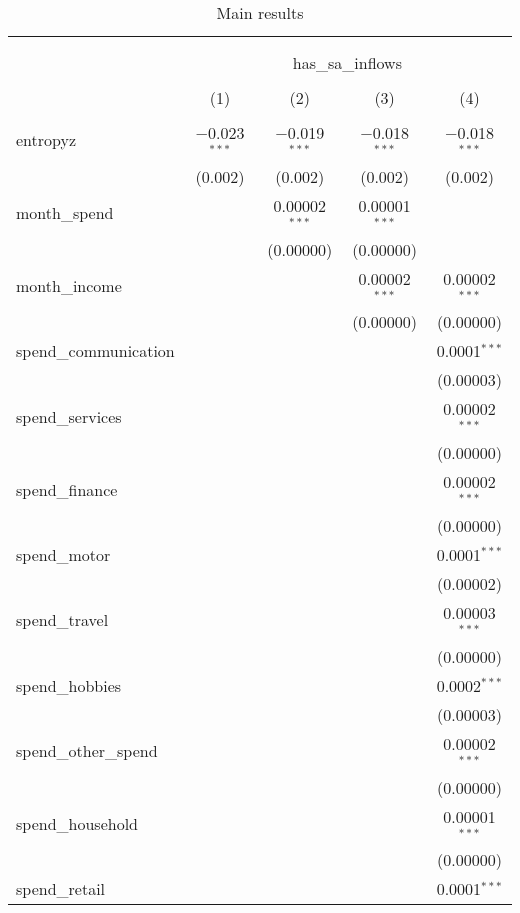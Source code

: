 
\begin{table}[!htbp] \centering 
  \caption{Main results} 
  \label{} 
\begin{tabular}{@{\extracolsep{5pt}}lcccc} 
\\[-1.8ex]\hline 
\hline \\[-1.8ex] 
\\[-1.8ex] & \multicolumn{4}{c}{has\_sa\_inflows} \\ 
\\[-1.8ex] & (1) & (2) & (3) & (4)\\ 
\hline \\[-1.8ex] 
 entropyz & $-$0.023$^{***}$ & $-$0.019$^{***}$ & $-$0.018$^{***}$ & $-$0.018$^{***}$ \\ 
  & (0.002) & (0.002) & (0.002) & (0.002) \\ 
  month\_spend &  & 0.00002$^{***}$ & 0.00001$^{***}$ &  \\ 
  &  & (0.00000) & (0.00000) &  \\ 
  month\_income &  &  & 0.00002$^{***}$ & 0.00002$^{***}$ \\ 
  &  &  & (0.00000) & (0.00000) \\ 
  spend\_communication &  &  &  & 0.0001$^{***}$ \\ 
  &  &  &  & (0.00003) \\ 
  spend\_services &  &  &  & 0.00002$^{***}$ \\ 
  &  &  &  & (0.00000) \\ 
  spend\_finance &  &  &  & 0.00002$^{***}$ \\ 
  &  &  &  & (0.00000) \\ 
  spend\_motor &  &  &  & 0.0001$^{***}$ \\ 
  &  &  &  & (0.00002) \\ 
  spend\_travel &  &  &  & 0.00003$^{***}$ \\ 
  &  &  &  & (0.00000) \\ 
  spend\_hobbies &  &  &  & 0.0002$^{***}$ \\ 
  &  &  &  & (0.00003) \\ 
  spend\_other\_spend &  &  &  & 0.00002$^{***}$ \\ 
  &  &  &  & (0.00000) \\ 
  spend\_household &  &  &  & 0.00001$^{***}$ \\ 
  &  &  &  & (0.00000) \\ 
  spend\_retail &  &  &  & 0.0001$^{***}$ \\ 

\end{tabular}
\end{table}
